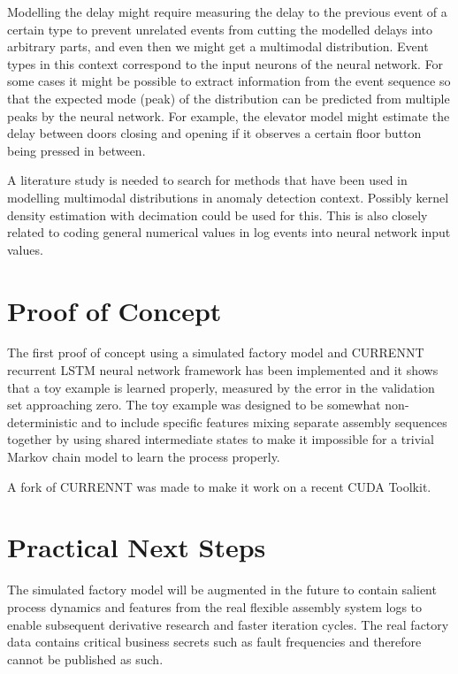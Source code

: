 \documentclass[a4paper,10pt]{article}
\begin{document}
Modelling the delay might require measuring the delay to the previous event of a certain type to prevent unrelated events from cutting the modelled delays into arbitrary parts,
and even then we might get a multimodal distribution. Event types in this context correspond to the input neurons of the neural network.
For some cases it might be possible to extract information from the event sequence so that
the expected mode (peak) of the distribution can be predicted from multiple peaks by the neural network. For example,
the elevator model might estimate the delay between doors closing and opening if it observes a certain floor button being pressed in between.

A literature study is needed to search for methods that have been used in modelling multimodal distributions in anomaly detection context. Possibly kernel density estimation
with decimation could be used for this. This is also closely related to coding general numerical values in log events into neural network input values.

\section{Proof of Concept}

The first proof of concept using a simulated factory model and CURRENNT\cite{CURRENNT} recurrent LSTM neural network framework
has been implemented and it shows that a toy example\cite{PoC}
is learned properly, measured by the error in the validation set approaching zero. The toy example was designed to be somewhat non-deterministic and to include specific
features mixing separate assembly sequences together by using shared intermediate states to make it impossible for a trivial Markov chain model to learn the process properly.

A fork of CURRENNT was made to make it work on a recent CUDA Toolkit\cite{CURRENNTFORK}.

\section{Practical Next Steps}

The simulated factory model will be augmented in the future to contain salient process dynamics and features from the real flexible assembly system logs to enable subsequent
derivative research and faster iteration cycles. The real factory data contains critical business secrets such as fault frequencies and therefore cannot be published as such.
\end{document}
